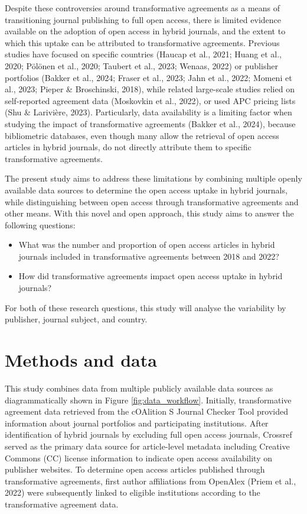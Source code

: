 \documentclass[a4paper,man,floatsintext,longtable,noextraspace,12pt]{apa6}
\providecommand{\tightlist}{%
  \setlength{\itemsep}{0pt}\setlength{\parskip}{0pt}}
\begin{document}
Despite these controversies around transformative agreements as a means
of transitioning journal publishing to full open access, there is
limited evidence available on the adoption of open access in hybrid
journals, and the extent to which this uptake can be attributed to
transformative agreements. Previous studies have focused on specific
countries (Haucap et al., 2021; Huang et al., 2020; Pölönen et al.,
2020; Taubert et al., 2023; Wenaas, 2022) or publisher portfolios
(Bakker et al., 2024; Fraser et al., 2023; Jahn et al., 2022; Momeni et
al., 2023; Pieper \& Broschinski, 2018), while related large-scale
studies relied on self-reported agreement data (Moskovkin et al., 2022),
or used APC pricing lists (Shu \& Larivière, 2023). Particularly, data
availability is a limiting factor when studying the impact of
transformative agreements (Bakker et al., 2024), because bibliometric
databases, even though many allow the retrieval of open access articles
in hybrid journals, do not directly attribute them to specific
transformative agreements.

The present study aims to address these limitations by combining
multiple openly available data sources to determine the open access
uptake in hybrid journals, while distinguishing between open access
through transformative agreements and other means. With this novel and
open approach, this study aims to answer the following questions:

\begin{itemize}
\tightlist
\item
  What was the number and proportion of open access articles in hybrid
  journals included in transformative agreements between 2018 and 2022?
\item
  How did transformative agreements impact open access uptake in hybrid
  journals?
\end{itemize}

For both of these research questions, this study will analyse the
variability by publisher, journal subject, and country.

\hypertarget{methods-and-data}{%
\section{Methods and data}\label{methods-and-data}}

This study combines data from multiple publicly available data sources
as diagrammatically shown in Figure \ref{fig:data_workflow}. Initially,
transformative agreement data retrieved from the cOAlition S Journal
Checker Tool provided information about journal portfolios and
participating institutions. After identification of hybrid journals by
excluding full open access journals, Crossref served as the primary data
source for article-level metadata including Creative Commons (CC)
license information to indicate open access availability on publisher
websites. To determine open access articles published through
transformative agreements, first author affiliations from OpenAlex
(Priem et al., 2022) were subsequently linked to eligible institutions
according to the transformative agreement data.
\end{document}
